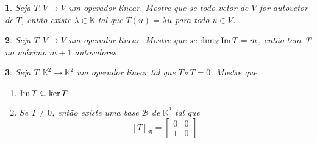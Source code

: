 \documentclass[12pt]{exam}
\newtheorem{exercicio}{}
\newcommand{\im}{{\rm Im\,}}
\newcommand{\sub}{\subseteq}
\newcommand{\cp}[1]{\mathbb{#1}}
\begin{document}
\begin{exercicio}
  Seja $T : V \to V$ um operador linear. Mostre que se todo vetor de $V$ for autovetor de $T$, ent\~ao existe $\lambda \in \cp{K}$ tal que $T(u) = \lambda u$ para todo $u \in V$.
\end{exercicio}

\begin{exercicio}
  Seja $T : V \to V$ um operador linear. Mostre que se $\dim_\cp{K}\im T = m$, ent\~ao $tem$ T no m\'aximo $m + 1$ autovalores.
\end{exercicio}

\begin{exercicio}
  Seja $T : \cp{K}^2 \to \cp{K}^2$ um operador linear tal que $T \circ T = 0$. Mostre que
  \begin{enumerate}[label=({\alph*})]
    \item $\im T \sub \ker T$
    \item Se $T \ne 0$, ent\~ao existe uma base $\mathcal{B}$ de $\cp{K}^2$ tal que
    \[
      [T]_\mathcal{B} = \begin{bmatrix} 0 & 0\\ 1 & 0\end{bmatrix}.
    \]
  \end{enumerate}
\end{exercicio}
\end{document}
